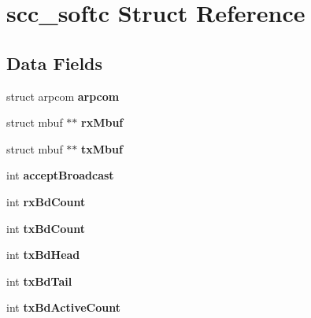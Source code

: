 \hypertarget{structscc__softc}{}\section{scc\+\_\+softc Struct Reference}
\label{structscc__softc}
\subsection*{Data Fields}
\begin{DoxyCompactItemize}
\item 
\mbox{\label{structscc__softc_af62306d2f1c1d7f446fdd32def7abcfd}} 
struct arpcom {\bfseries arpcom}
\item 
\mbox{\label{structscc__softc_a6a603326e20b60988fb998f5bea6747f}} 
struct mbuf $\ast$$\ast$ {\bfseries rx\+Mbuf}
\item 
\mbox{\label{structscc__softc_aebbf11b05f416fa2c6f8727cb9f3ea30}} 
struct mbuf $\ast$$\ast$ {\bfseries tx\+Mbuf}
\item 
\mbox{\label{structscc__softc_a71b96bb056d0e0b0fa1b5c48e8025508}} 
int {\bfseries accept\+Broadcast}
\item 
\mbox{\label{structscc__softc_aee8405c22d06bb32a2ff117cf8058b77}} 
int {\bfseries rx\+Bd\+Count}
\item 
\mbox{\label{structscc__softc_a3e27f9f8850d768277fbce89d54f33c1}} 
int {\bfseries tx\+Bd\+Count}
\item 
\mbox{\label{structscc__softc_a66f826fa84893cfeecac33c5e357d98a}} 
int {\bfseries tx\+Bd\+Head}
\item 
\mbox{\label{structscc__softc_a85f1033d75142fdbd2c5dbe6751610e3}} 
int {\bfseries tx\+Bd\+Tail}
\item 
\mbox{\label{structscc__softc_ab3ef49ac88e4b41b946a377bab9200d8}} 
int {\bfseries tx\+Bd\+Active\+Count}
\item 
\mbox{\label{structscc__softc_a6ed6065bbce76ee0108f089ca430ae38}} 

\end{DoxyCompactItemize}
